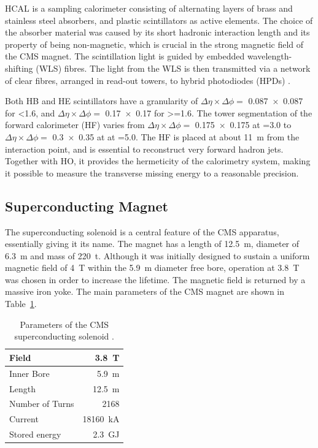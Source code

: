 HCAL is a sampling calorimeter consisting of alternating layers of brass and stainless steel absorbers, and plastic
scintillators as active elements. The choice of the absorber material was caused by its short hadronic interaction
length and its property of being non-magnetic, which is crucial in the strong magnetic field of the CMS magnet. The
scintillation light is guided by embedded wavelength-shifting (WLS) fibres. The light from the WLS is then transmitted
via a network of clear fibres, arranged in read-out towers, to hybrid photodiodes (HPDs) \autocite{CMS}.

Both HB and HE scintillators have a granularity of $\Delta \eta \times \Delta \phi =$ \num{0.087x0.087} for \abs\eta
\num{<1.6}, and $\Delta \eta \times \Delta \phi =$ \num{0.17x0.17} for \abs\eta \num{>=1.6}. The tower segmentation of
the forward calorimeter (HF) varies from $\Delta \eta \times \Delta \phi =$ \num{0.175x0.175} at \abs\eta \num{=3.0} to
$\Delta \eta \times \Delta \phi =$ \num{0.3x0.35} at at \abs\eta \num{=5.0}. The HF is placed at about \SI{11}{\metre}
from the interaction point, and is essential to reconstruct very forward hadron jets. Together with HO, it provides the
hermeticity of the calorimetry system, making it possible to measure the transverse missing energy to a reasonable
precision.


\subsection{Superconducting Magnet}
The superconducting solenoid is a central feature of the CMS apparatus, essentially giving it its name. The magnet
has a length of \SI{12.5}{\metre}, diameter of \SI{6.3}{\metre} and mass of \SI{220}{\tonne}. Although it was initially
designed to sustain a uniform magnetic field of \SI{4}{\tesla} within the \SI{5.9}{\metre} diameter free bore, operation
at \SI{3.8}{\tesla} was chosen in order to increase the lifetime. The magnetic field is returned by a massive iron yoke.
The main parameters of the CMS magnet are shown in Table~\ref{tab:solenoid_parameters}.

\begin{table}[htbp]
\caption{Parameters of the CMS superconducting solenoid \autocite{CMS_TDR1, CMS_Solenoid}.}
\label{tab:solenoid_parameters}
\centering
\begin{tabular}{|l|r|}
  \toprule             
  Field & \SI{3.8}{\tesla} \\
  \midrule
  Inner Bore & \SI{5.9}{\metre} \\
  \midrule
  Length & \SI{12.5}{\metre} \\
  \midrule
  Number of Turns & \num{2168} \\
  \midrule
  Current & \SI{18160}{\kilo\ampere} \\
  \midrule
  Stored energy & \SI{2.3}{\giga\joule} \\
  \bottomrule
\end{tabular}
\end{table}

